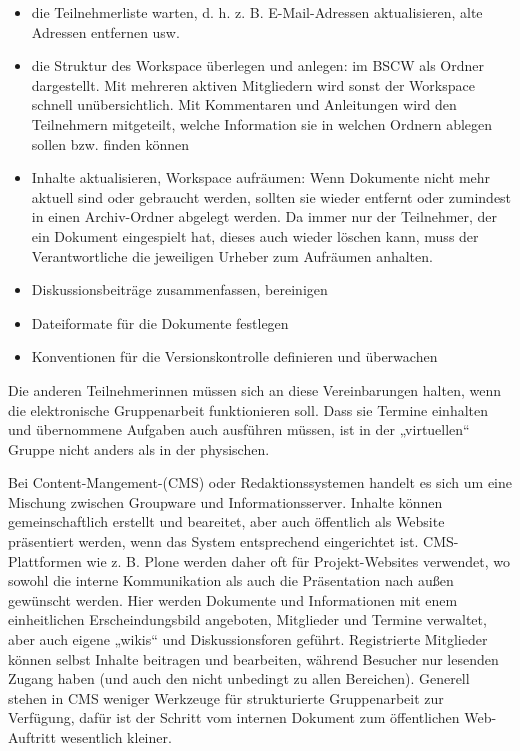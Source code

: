 \documentclass[]{book}
\providecommand{\tightlist}{%
  \setlength{\itemsep}{0pt}\setlength{\parskip}{0pt}}
\theoremstyle{definition}
\theoremstyle{definition}
\theoremstyle{definition}
\theoremstyle{remark}
\begin{document}
\begin{itemize}
\tightlist
\item
  die Teilnehmerliste warten, d. h. z. B. E-Mail-Adressen aktualisieren,
  alte Adressen entfernen usw.
\item
  die Struktur des Workspace überlegen und anlegen: im BSCW als Ordner
  dargestellt. Mit mehreren aktiven Mitgliedern wird sonst der Workspace
  schnell unübersichtlich. Mit Kommentaren und Anleitungen wird den
  Teilnehmern mitgeteilt, welche Information sie in welchen Ordnern
  ablegen sollen bzw. finden können
\item
  Inhalte aktualisieren, Workspace aufräumen: Wenn Dokumente nicht mehr
  aktuell sind oder gebraucht werden, sollten sie wieder entfernt oder
  zumindest in einen Archiv-Ordner abgelegt werden. Da immer nur der
  Teilnehmer, der ein Dokument eingespielt hat, dieses auch wieder
  löschen kann, muss der Verantwortliche die jeweiligen Urheber zum
  Aufräumen anhalten.
\item
  Diskussionsbeiträge zusammenfassen, bereinigen
\item
  Dateiformate für die Dokumente festlegen
\item
  Konventionen für die Versionskontrolle definieren und überwachen
\end{itemize}

Die anderen Teilnehmerinnen müssen sich an diese Vereinbarungen halten,
wenn die elektronische Gruppenarbeit funktionieren soll. Dass sie
Termine einhalten und übernommene Aufgaben auch ausführen müssen, ist in
der „virtuellen`` Gruppe nicht anders als in der physischen.

Bei Content-Mangement-(CMS) oder Redaktionssystemen handelt es sich um
eine Mischung zwischen Groupware und Informationsserver. Inhalte können
gemeinschaftlich erstellt und beareitet, aber auch öffentlich als
Website präsentiert werden, wenn das System entsprechend eingerichtet
ist. CMS-Plattformen wie z. B. Plone werden daher oft für
Projekt-Websites verwendet, wo sowohl die interne Kommunikation als auch
die Präsentation nach außen gewünscht werden. Hier werden Dokumente und
Informationen mit enem einheitlichen Erscheindungsbild angeboten,
Mitglieder und Termine verwaltet, aber auch eigene „wikis`` und
Diskussionsforen geführt. Registrierte Mitglieder können selbst Inhalte
beitragen und bearbeiten, während Besucher nur lesenden Zugang haben
(und auch den nicht unbedingt zu allen Bereichen). Generell stehen in
CMS weniger Werkzeuge für strukturierte Gruppenarbeit zur Verfügung,
dafür ist der Schritt vom internen Dokument zum öffentlichen
Web-Auftritt wesentlich kleiner.
\end{document}
